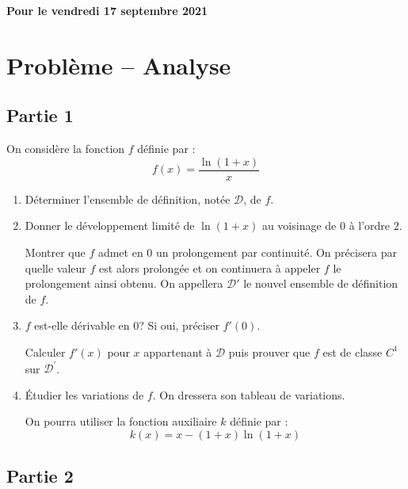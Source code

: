 \documentclass[a4paper,french,11pt,twoside]{VcCours}
\begin{document}
\begin{center}
\large\bf 
Pour le vendredi 17 septembre 2021
\end{center}
\separationTitre


\section*{Problème -- Analyse}


\subsection*{Partie 1}


\medskip

\noindent On considère la fonction $f$ définie par :
$$f\left(  x\right)=\dfrac{\ln\left(  1+x\right)}{x}$$

\medskip

\begin{enumerate}
\item Déterminer l'ensemble de définition, notée $\mathcal{D}$, de $f$.
\item Donner le développement limité de $\ln\left(  1+x\right)  $ au voisinage
de $0$ à l'ordre $2$.

\noindent Montrer que $f$ admet en $0$ un prolongement par continuité. On précisera par
quelle valeur $f$ est alors prolongée et on continuera à appeler $f$ le prolongement ainsi obtenu. On appellera $\mathcal{D}'$ le nouvel ensemble de définition de $f$.

\item $f$ est-elle dérivable en $0$? Si oui, préciser $f'(0)$.

\noindent Calculer $f'(x)$ pour $x$ appartenant à $\mathcal{D}$ puis prouver que $f$ est de
classe $C^{1}$ sur $\mathcal{D}^{\prime}$.

\item Étudier les variations de $f$. On dressera son tableau de variations.

\noindent On pourra utiliser la fonction auxiliaire $k$ définie par : 
$$k\left(x\right)  =x-\left(  1+x\right)  \ln\left(  1+x\right)$$
\end{enumerate}

\medskip

\subsection*{Partie 2}
\end{document}

